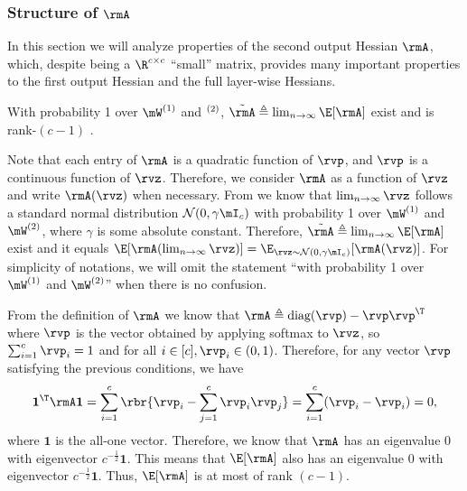 \subsubsection{Structure of $\rmA$}
\label{sec:proof-A-structure}
In this section we will analyze properties of the second output Hessian $\rmA$, which, despite being a $\R^{c\times c}$ ``small'' matrix, provides many important properties to the first output Hessian and the full layer-wise Hessians.

\begin{lemma}
\label{lemma:A-rank-c-1}
With probability 1 over $\mW^{(1)}$ and $\rm^{(2)}$, $\tilde{\rmA}\triangleq\lim_{n\to\infty}\E[\rmA]$ exist and is rank-$(c-1)$ .
\end{lemma}

\begin{proofof}{}
Note that each entry of $\rmA$ is a quadratic function of $\rvp$, and $\rvp$ is a continuous function of $\rvz$. Therefore, we consider $\rmA$ as a function of $\rvz$ and write $\rmA(\rvz)$ when necessary. From  we know that $\lim_{n\to\infty}\rvz$ follows a standard normal distribution $\mathcal{N}(0,\gamma \mI_c)$ with probability 1 over $\mW^{(1)}$ and $\mW^{(2)}$, where $\gamma$ is some absolute constant. Therefore, $\tilde{\rmA}\triangleq\lim_{n\to\infty}\E[\rmA]$ exist and it equals $\E[\rmA(\lim_{n\to\infty} \rvz)]=\E_{\rvz\sim\mathcal{N}(0,\gamma \mI_c)}[\rmA(\rvz)]$. For simplicity of notations, we will omit the statement ``with probability 1 over $\mW^{(1)}$ and $\mW^{(2)}$'' when there is no confusion.

From the definition of $\rmA$ we know that $\rmA\triangleq \text{diag}(\rvp)-\rvp\rvp^\T$ where $\rvp$ is the vector obtained by applying softmax to $\rvz$, so $\sum_{i=1}^c \rvp_i=1$ and for all $i\in[c], \rvp_i\in(0,1)$. Therefore, for any vector $\rvp$ satisfying the previous conditions, we have
\begin{equation}
\textbf{1}^\T\rmA\textbf{1} = \sum_{i=1}^c\rbr{\rvp_i-\sum_{j=1}^c\rvp_i\rvp_j} = \sum_{i=1}^c(\rvp_i-\rvp_i) =0,
\end{equation}
where $\textbf{1}$ is the all-one vector. Therefore, we know that $\rmA$ has an eigenvalue 0 with eigenvector $c^{-\frac12}\textbf{1}$. This means that $\E[\rmA]$ also has an eigenvalue 0 with eigenvector $c^{-\frac12}\textbf{1}$. Thus, $\E[\rmA]$ is at most of rank $(c-1)$.


\end{proofof}
